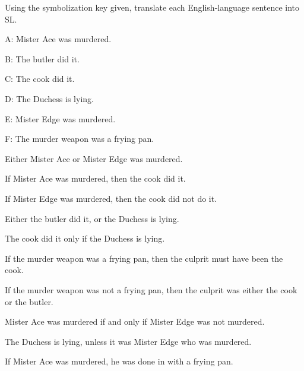 \problempart Using the symbolization key given, translate each English-language sentence into SL.
\begin{ekey}
\item[A:] Mister Ace was murdered.
\item[B:] The butler did it.
\item[C:] The cook did it.
\item[D:] The Duchess is lying.
\item[E:] Mister Edge was murdered.
\item[F:] The murder weapon was a frying pan.
\end{ekey}
\begin{earg}
\item Either Mister Ace or Mister Edge was murdered.
\item If Mister Ace was murdered, then the cook did it.
\item If Mister Edge was murdered, then the cook did not do it.
\item Either the butler did it, or the Duchess is lying.
\item The cook did it only if the Duchess is lying.
\item If the murder weapon was a frying pan, then the culprit must have been the cook.
\item If the murder weapon was not a frying pan, then the culprit was either the cook or the butler.
\item Mister Ace was murdered if and only if Mister Edge was not murdered.
\item The Duchess is lying, unless it was Mister Edge who was murdered.
\item If Mister Ace was murdered, he was done in with a frying pan.
\end{earg}




